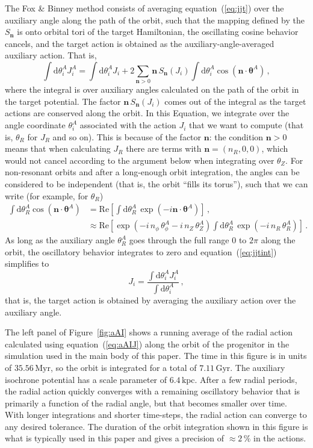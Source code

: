 \documentclass[12pt,preprint]{aastex}
\newcommand{\dd}{\mathrm{d}}
\newcommand{\eqnname}{equation}
\renewcommand{\figurename}{Figure}
\renewcommand{\vec}[1]{\ensuremath{\mathbf{#1}}}
\newcommand{\vecn}{\ensuremath{\vec{n}}}
\newcommand{\veca}{\ensuremath{\boldsymbol\theta}}
\newcommand{\Myr}{\ensuremath{\,\mathrm{Myr}}}
\newcommand{\Gyr}{\ensuremath{\,\mathrm{Gyr}}}
\newcommand{\kpc}{\ensuremath{\,\mathrm{kpc}}}
\begin{document}
The Fox \& Binney method consists of averaging \eqnname~(\ref{eq:jjt})
over the auxiliary angle along the path of the orbit, such that the
mapping defined by the $S_{\vecn}$ is onto orbital tori of the target
Hamiltonian, the oscillating cosine behavior cancels, and the target
action is obtained as the auxiliary-angle-averaged auxiliary
action. That is,
\begin{equation}\label{eq:jjtint}
  \int \dd \theta_i^A J_i^A = \int \dd \theta_i^A J_i + 2 \sum_{\vecn > 0} \vecn\,S_{\vecn}(J_i)\int \dd \theta_i^A\cos(\vecn\cdot\veca^A)\,,
\end{equation}
where the integral is over auxiliary angles calculated on the path of
the orbit in the target potential. The factor $\vecn\,S_{\vecn}(J_i)$
comes out of the integral as the target actions are conserved along
the orbit. In this Equation, we integrate over the angle coordinate
$\theta_i^A$ associated with the action $J_i$ that we want to compute
(that is, $\theta_R$ for $J_R$ and so on). This is because of the
factor $\vecn$: the condition $\vecn > 0$ means that when calculating
$J_R$ there are terms with $\vecn = (n_R,0,0)$, which would not cancel
according to the argument below when integrating over $\theta_Z$. For
non-resonant orbits and after a long-enough orbit integration, the
angles can be considered to be independent (that is, the orbit ``fills
its torus''), such that we can write (for example, for $\theta_R$)
\begin{equation}
\begin{split}
  \int \dd \theta_R^A\cos(\vecn\cdot\veca^A) & = \mathrm{Re}\left[\int \dd \theta_R^A\,\exp(-i\vecn\cdot\veca^A)\right]\,, \\
  & \approx \mathrm{Re}\left[\exp(-i\,n_\phi\,\theta^A_\phi-i\,n_Z\,\theta^A_Z)\int \dd \theta_R^A\,\exp(-i\,n_R\,\theta^A_R)\right]\,.
\end{split}
\end{equation}
As long as the auxiliary angle $\theta^A_R$ goes through the full range
$0$ to $2\pi$ along the orbit, the oscillatory behavior integrates to
zero and \eqnname~(\ref{eq:jjtint}) simplifies to
\begin{equation}\label{eq:aAIJ}
  J_i = \frac{\int \dd \theta_i^A J_i^A}{\int \dd \theta_i^A}\,,
\end{equation}
that is, the target action is obtained by averaging the auxiliary
action over the auxiliary angle.

The left panel of \figurename~\ref{fig:aAI} shows a running average of
the radial action calculated using \eqnname~(\ref{eq:aAIJ}) along the
orbit of the progenitor in the simulation used in the main body of
this paper. The time in this figure is in units of $35.56\Myr$, so the
orbit is integrated for a total of $7.11\Gyr$. The auxiliary isochrone
potential has a scale parameter of $6.4\kpc$. After a few radial
periods, the radial action quickly converges with a remaining
oscillatory behavior that is primarily a function of the radial angle,
but that becomes smaller over time. With longer integrations and
shorter time-steps, the radial action can converge to any desired
tolerance. The duration of the orbit integration shown in this figure
is what is typically used in this paper and gives a precision of
$\approx2\,\%$ in the actions.
\end{document}
